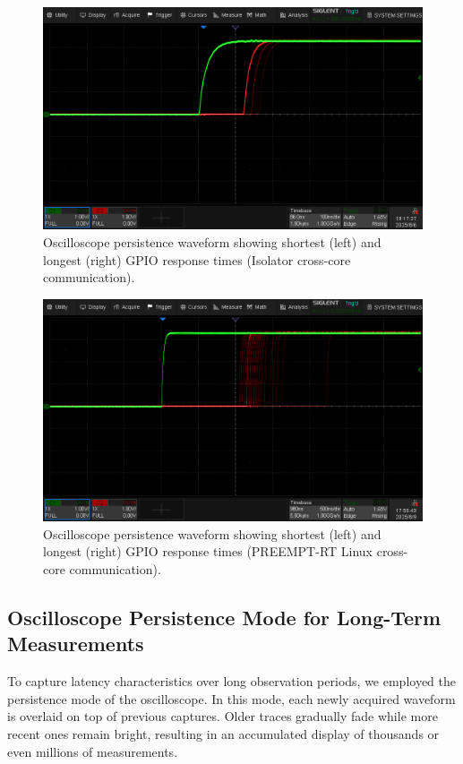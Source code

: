 \documentclass[letterpaper]{article}
\begin{document}
\begin{figure}[h]
  \centering
  \includegraphics[width=0.8\linewidth]{figures/islcrosscoreintgpio.png}
  \caption{Oscilloscope persistence waveform showing shortest (left) and longest (right) GPIO response times (Isolator cross-core communication).}
  \label{fig:islcrossgpio}
\end{figure}

\begin{figure}[h]
  \centering
  \includegraphics[width=0.8\linewidth]{figures/linuxcrosscoreintgpio.png}
  \caption{Oscilloscope persistence waveform showing shortest (left) and longest (right) GPIO response times (PREEMPT-RT Linux cross-core communication).}
  \label{fig:linuxcrossgpio}
\end{figure}

\subsection{Oscilloscope Persistence Mode for Long-Term Measurements}

To capture latency characteristics over long observation periods, we employed the persistence
mode of the oscilloscope. In this mode, each newly acquired waveform is overlaid on top of
previous captures. Older traces gradually fade while more recent ones remain bright, resulting
in an accumulated display of thousands or even millions of measurements.
\end{document}

